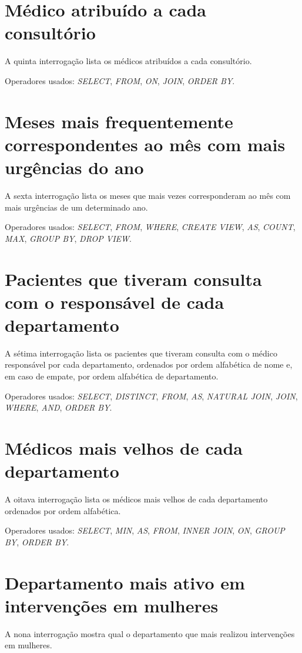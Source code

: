 \documentclass[article, a4paper, 12pt, oneside]{memoir}
\begin{document}
\section{Médico atribuído a cada consultório}
A quinta interrogação lista os médicos atribuídos a cada consultório.

Operadores usados: \emph{SELECT}, \emph{FROM}, \emph{ON}, \emph{JOIN}, \emph{ORDER BY}.

\section{Meses mais frequentemente correspondentes ao mês com mais urgências do ano}
A sexta interrogação lista os meses que mais vezes corresponderam ao mês com mais urgências de um determinado ano.

Operadores usados: \emph{SELECT}, \emph{FROM}, \emph{WHERE}, \emph{CREATE VIEW}, \emph{AS}, \emph{COUNT}, \emph{MAX}, \emph{GROUP BY}, \emph{DROP VIEW}.

\section{Pacientes que tiveram consulta com o responsável de cada departamento}
A sétima interrogação lista os pacientes que tiveram consulta com o médico responsável por cada departamento, ordenados por ordem alfabética de nome e, em caso de empate, por ordem alfabética de departamento.

Operadores usados: \emph{SELECT}, \emph{DISTINCT}, \emph{FROM}, \emph{AS}, \emph{NATURAL JOIN}, \emph{JOIN}, \emph{WHERE}, \emph{AND}, \emph{ORDER BY}.

\section{Médicos mais velhos de cada departamento}
A oitava interrogação lista os médicos mais velhos de cada departamento ordenados por ordem alfabética.

Operadores usados: \emph{SELECT}, \emph{MIN}, \emph{AS}, \emph{FROM}, \emph{INNER JOIN}, \emph{ON}, \emph{GROUP BY}, \emph{ORDER BY}.

\section{Departamento mais ativo em intervenções em mulheres}
A nona interrogação mostra qual o departamento que mais realizou intervenções em mulheres.
\end{document}
